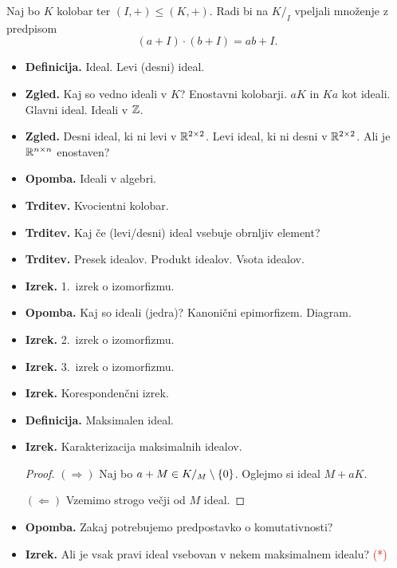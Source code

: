 \begin{enumerate}
    Naj bo \(K\) kolobar ter \((I, +) \leq (K, +)\). Radi bi na \(K/_I\) vpeljali množenje z predpisom
    \[(a + I) \cdot (b + I) = ab + I.\]
    \begin{itemize}
        \item \textbf{Definicija.} Ideal. Levi (desni) ideal.
        \item \textbf{Zgled.} Kaj so vedno ideali v \(K\)? Enostavni kolobarji. \(aK\) in \(Ka\) kot ideali. Glavni ideal. Ideali v \(\mathbb{Z}\).
        \item \textbf{Zgled.} Desni ideal, ki ni levi v \(\mathbb{R}^{2 \times 2}\). Levi ideal, ki ni desni v \(\mathbb{R}^{2 \times 2}\). Ali je \(\mathbb{R}^{n \times n}\) enostaven?
        \item \textbf{Opomba.} Ideali v algebri.
        \item \textbf{Trditev.} Kvocientni kolobar.
        \item \textbf{Trditev.} Kaj če (levi/desni) ideal vsebuje obrnljiv element?
        \item \textbf{Trditev.} Presek idealov. Produkt idealov. Vsota idealov.
        \item \textbf{Izrek.} 1.\ izrek o izomorfizmu. \todo{*}
        \item \textbf{Opomba.} Kaj so ideali (jedra)? Kanonični epimorfizem. Diagram.
        \item \textbf{Izrek.} 2.\ izrek o izomorfizmu.
        \item \textbf{Izrek.} 3.\ izrek o izomorfizmu.
        \item \textbf{Izrek.} Korespondenčni izrek.
        \item \textbf{Definicija.} Maksimalen ideal.
        \item \textbf{Izrek.} Karakterizacija maksimalnih idealov. \todo{*}
        \begin{proof}
            \((\Rightarrow)\) Naj bo \(a + M \in K/_M \setminus \{0\}\). Oglejmo si ideal \(M + aK\).

            \((\Leftarrow)\) Vzemimo strogo večji od \(M\) ideal.
        \end{proof}
        \item \textbf{Opomba.} Zakaj potrebujemo predpostavko o komutativnosti?
        \item \textbf{Izrek.} Ali je vsak pravi ideal vsebovan v nekem maksimalnem idealu? \textcolor{red}{(*)}
    \end{itemize}
\end{enumerate}


